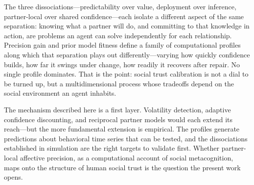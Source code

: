 The three dissociations---predictability over value, deployment over inference, partner-local over shared confidence---each isolate a different aspect of the same separation: knowing what a partner will do, and committing to that knowledge in action, are problems an agent can solve independently for each relationship. Precision gain and prior model fitness define a family of computational profiles along which that separation plays out differently---varying how quickly confidence builds, how far it swings under change, how readily it recovers after repair. No single profile dominates. That is the point: social trust calibration is not a dial to be turned up, but a multidimensional process whose tradeoffs depend on the social environment an agent inhabits.

The mechanism described here is a first layer. Volatility detection, adaptive confidence discounting, and reciprocal partner models would each extend its reach---but the more fundamental extension is empirical. The profiles generate predictions about behavioral time series that can be tested, and the dissociations established in simulation are the right targets to validate first. Whether partner-local affective precision, as a computational account of social metacognition, maps onto the structure of human social trust is the question the present work opens.
